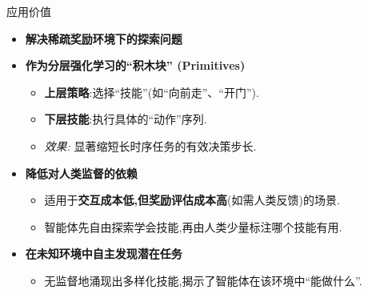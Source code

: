 \documentclass{beamer}
\begin{document}
\begin{frame}{应用价值}

    \begin{itemize}
        \item \textbf{解决稀疏奖励环境下的探索问题}
        \vspace{0.5cm}

        \item \textbf{作为分层强化学习的“积木块” (Primitives)}
        \begin{itemize}
            \item \textbf{上层策略}:选择“技能”(如“向前走”、“开门”).
            \item \textbf{下层技能}:执行具体的“动作”序列.
            \item \textit{效果:} 显著缩短长时序任务的有效决策步长.
        \end{itemize}
        \vspace{0.5cm}
        
        \item \textbf{降低对人类监督的依赖}
        \begin{itemize}
            \item 适用于\textbf{交互成本低,但奖励评估成本高}(如需人类反馈)的场景.
            \item 智能体先自由探索学会技能,再由人类少量标注哪个技能有用.
        \end{itemize}
        \vspace{0.5cm}
        
        \item \textbf{在未知环境中自主发现潜在任务}
        \begin{itemize}
            \item 无监督地涌现出多样化技能,揭示了智能体在该环境中“能做什么”.
        \end{itemize}
    \end{itemize}

\end{frame}
\end{document}
